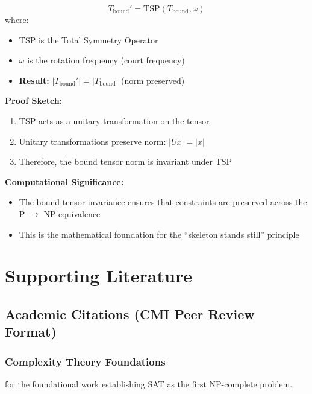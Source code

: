 \documentclass[11pt, letterpaper]{article}
\begin{document}
\begin{equation}
T_{\text{bound}}' = \text{TSP}(T_{\text{bound}}, \omega)
\end{equation}
where:
\begin{itemize}
    \item TSP is the Total Symmetry Operator
    \item $\omega$ is the rotation frequency (court frequency)
    \item \textbf{Result:} $|T_{\text{bound}}'| = |T_{\text{bound}}|$ (norm preserved)
\end{itemize}

\textbf{Proof Sketch:}
\begin{enumerate}
    \item TSP acts as a unitary transformation on the tensor
    \item Unitary transformations preserve norm: $|Ux| = |x|$
    \item Therefore, the bound tensor norm is invariant under TSP
\end{enumerate}

\textbf{Computational Significance:}
\begin{itemize}
    \item The bound tensor invariance ensures that constraints are preserved across the P $\to$ NP equivalence
    \item This is the mathematical foundation for the ``skeleton stands still'' principle
\end{itemize}

\section{Supporting Literature}

\subsection{Academic Citations (CMI Peer Review Format)}

\subsubsection{Complexity Theory Foundations}

\cite{cook1971} for the foundational work establishing SAT as the first NP-complete problem.
\end{document}
